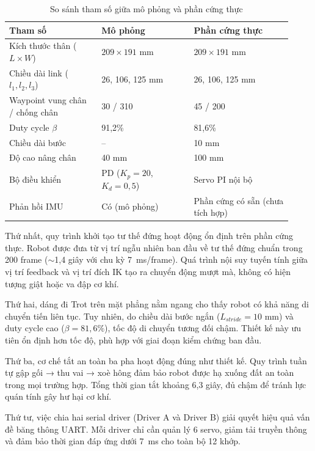 \begin{table}[H]
\centering
\caption{So sánh tham số giữa mô phỏng và phần cứng thực}
\label{tab:sim_vs_hw}
\renewcommand{\arraystretch}{1.3}
\begin{tabular}{|p{0.30\linewidth}|p{0.30\linewidth}|p{0.32\linewidth}|}
\hline
\textbf{Tham số} & \textbf{Mô phỏng} & \textbf{Phần cứng thực} \\ \hline
Kích thước thân ($L \times W$) & $209 \times 191$ mm & $209 \times 191$ mm \\ \hline
Chiều dài link ($l_1, l_2, l_3$) & 26, 106, 125 mm & 26, 106, 125 mm \\ \hline
Waypoint vung chân / chống chân & 30 / 310 & 45 / 200 \\ \hline
Duty cycle $\beta$ & 91,2\% & 81,6\% \\ \hline
Chiều dài bước & -- & 10 mm \\ \hline
Độ cao nâng chân & 40 mm & 100 mm \\ \hline
Bộ điều khiển & PD ($K_p=20$, $K_d=0,5$) & Servo PI nội bộ \\ \hline
Phản hồi IMU & Có (mô phỏng) & Phần cứng có sẵn (chưa tích hợp) \\ \hline
\end{tabular}
\end{table}

Thứ nhất, quy trình khởi tạo tư thế đứng hoạt động ổn định trên phần cứng thực. Robot được đưa từ vị trí ngẫu nhiên ban đầu về tư thế đứng chuẩn trong 200 frame ($\sim$1,4 giây với chu kỳ 7~ms/frame). Quá trình nội suy tuyến tính giữa vị trí feedback và vị trí đích IK tạo ra chuyển động mượt mà, không có hiện tượng giật hoặc va đập cơ khí.

Thứ hai, dáng đi Trot trên mặt phẳng nằm ngang cho thấy robot có khả năng di chuyển tiến liên tục. Tuy nhiên, do chiều dài bước ngắn ($L_{stride} = 10$ mm) và duty cycle cao ($\beta = 81{,}6\%$), tốc độ di chuyển tương đối chậm. Thiết kế này ưu tiên ổn định hơn tốc độ, phù hợp với giai đoạn kiểm chứng ban đầu.

Thứ ba, cơ chế tắt an toàn ba pha hoạt động đúng như thiết kế. Quy trình tuần tự gập gối → thu vai → xoè hông đảm bảo robot được hạ xuống đất an toàn trong mọi trường hợp. Tổng thời gian tắt khoảng 6,3 giây, đủ chậm để tránh lực quán tính gây hư hại cơ khí.

Thứ tư, việc chia hai serial driver (Driver A và Driver B) giải quyết hiệu quả vấn đề băng thông UART. Mỗi driver chỉ cần quản lý 6 servo, giảm tải truyền thông và đảm bảo thời gian đáp ứng dưới 7~ms cho toàn bộ 12 khớp.

